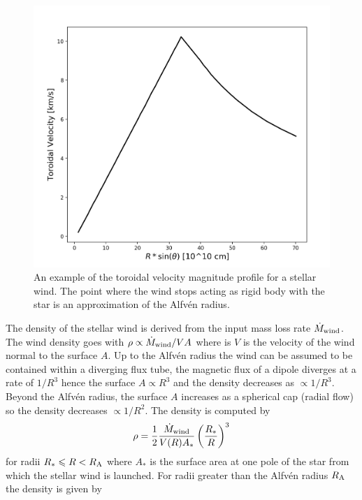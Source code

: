 \documentclass[fleqn,usenatbib]{mnras}
\begin{document}
\begin{figure}
    \centering
    \includegraphics[width=\linewidth]{figures/torVel}
    \caption{An example of the toroidal velocity magnitude profile for a stellar wind. The point where the wind stops acting as rigid body with the star is an approximation of the Alfv\'en radius.}
    \label{fig:polVel}
\end{figure}

The density of the stellar wind is derived from the input mass loss rate $\dot{M}_{\rm wind}$. The wind density goes with $\rho \propto \dot{M}_{\rm wind}/VA$ where is $V$ is the velocity of the wind normal to the surface $A$. Up to the Alfv\'en radius the wind can be assumed to be contained within a diverging flux tube, the magnetic flux of a dipole diverges at a rate of $1/R^3$ hence the surface $A \propto R^3$ and the density decreases as $\propto 1/R^3$. Beyond the Alfv\'en radius, the surface $A$ increases as a spherical cap (radial flow) so the density decreases $\propto 1/R^2$. The density is computed by
\begin{equation}
    \rho = \frac{1}{2}\frac{\dot{M}_{\rm wind}}{V(R)A_{\ast}}\left( \frac{R_{\ast}}{R}\right)^3
\end{equation}
for radii $R_{\ast}\leq R < R_{\rm A}$ where $A_{\ast}$ is the surface area at one pole of the star from which the stellar wind is launched. For radii greater than the Alfv\'en radius $R_{\rm A}$ the density is given by
\end{document}
